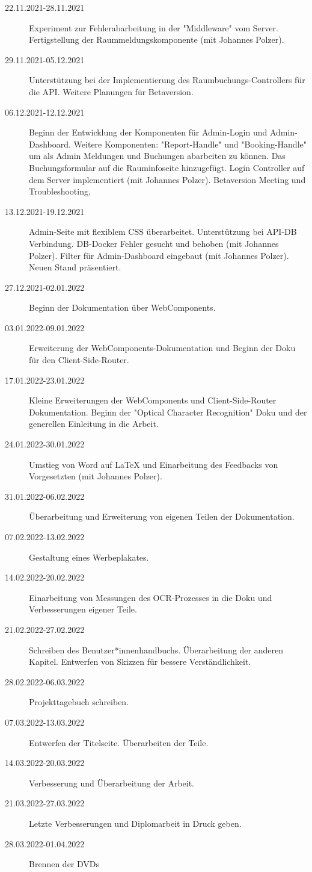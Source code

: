 \begin{description}
    \item[22.11.2021-28.11.2021] Experiment zur Fehlerabarbeitung in der "Middleware" vom Server. Fertigstellung der Raummeldungskomponente (mit Johannes Polzer).
    \item[29.11.2021-05.12.2021] Unterstützung bei der Implementierung des Raumbuchungs-Controllers für die API. Weitere Planungen für Betaversion.
    \item[06.12.2021-12.12.2021] Beginn der Entwicklung der Komponenten für Admin-Login und Admin-Dashboard. Weitere Komponenten: "Report-Handle" und "Booking-Handle" um als Admin Meldungen und Buchungen abarbeiten zu können. Das Buchungsformular auf die Rauminfoseite hinzugefügt. Login Controller auf dem Server implementiert (mit Johannes Polzer). Betaversion Meeting und Troubleshooting.
    \item[13.12.2021-19.12.2021] Admin-Seite mit flexiblem CSS überarbeitet. Unterstützung bei API-DB Verbindung. DB-Docker Fehler gesucht und behoben (mit Johannes Polzer). Filter für Admin-Dashboard eingebaut (mit Johannes Polzer). Neuen Stand präsentiert.
    \item[27.12.2021-02.01.2022] Beginn der Dokumentation über WebComponents.
    \item[03.01.2022-09.01.2022] Erweiterung der WebComponents-Dokumentation und Beginn der Doku für den Client-Side-Router.
    \item[17.01.2022-23.01.2022] Kleine Erweiterungen der WebComponents und Client-Side-Router Dokumentation. Beginn der "Optical Character Recognition" Doku und der generellen Einleitung in die Arbeit. 
    \item[24.01.2022-30.01.2022] Umstieg von Word auf LaTeX und Einarbeitung des Feedbacks von Vorgesetzten (mit Johannes Polzer). 
    \item[31.01.2022-06.02.2022] Überarbeitung und Erweiterung von eigenen Teilen der Dokumentation. 
    \item[07.02.2022-13.02.2022] Gestaltung eines Werbeplakates.
    \item[14.02.2022-20.02.2022] Einarbeitung von Messungen des OCR-Prozesses in die Doku und Verbesserungen eigener Teile.
    \item[21.02.2022-27.02.2022] Schreiben des Benutzer*innenhandbuchs. Überarbeitung der anderen Kapitel. Entwerfen von Skizzen für bessere Verständlichkeit.
    \item[28.02.2022-06.03.2022] Projekttagebuch schreiben. 
    \item[07.03.2022-13.03.2022] Entwerfen der Titelseite. Überarbeiten der Teile.
    \item[14.03.2022-20.03.2022] Verbesserung und Überarbeitung der Arbeit.
    \item[21.03.2022-27.03.2022] Letzte Verbesserungen und Diplomarbeit in Druck geben.
    \item[28.03.2022-01.04.2022] Brennen der DVDs
\end{description}